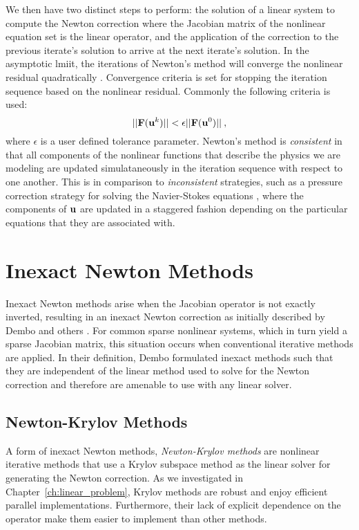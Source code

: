 We then have two distinct steps to perform: the solution of a linear
system to compute the Newton correction where the Jacobian matrix of
the nonlinear equation set is the linear operator, and the application
of the correction to the previous iterate's solution to arrive at the
next iterate's solution. In the asymptotic lmiit, the iterations of
Newton's method will converge the nonlinear residual quadratically
\citep{kelley_iterative_1995}. Convergence criteria is set for
stopping the iteration sequence based on the nonlinear
residual. Commonly the following criteria is used:
\begin{equation}
  ||\mathbf{F}(\mathbf{u}^{k})|| < \epsilon ||\mathbf{F}(\mathbf{u}^{0})||\:,
  \label{eq:newton_stopping_criteria}
\end{equation}
where $\epsilon$ is a user defined tolerance parameter. Newton's
method is \textit{consistent} in that all components of the nonlinear
functions that describe the physics we are modeling are updated
simulataneously in the iteration sequence with respect to one
another. This is in comparison to \textit{inconsistent} strategies,
such as a pressure correction strategy for solving the Navier-Stokes
equations \citep{pletcher_computational_1997}, where the components of
$\mathbf{u}$ are updated in a staggered fashion depending on the
particular equations that they are associated with.

\section{Inexact Newton Methods}
\label{sec:newton_methods}
Inexact Newton methods arise when the Jacobian operator is not exactly
inverted, resulting in an inexact Newton correction as initially
described by Dembo and others \citep{dembo_inexact_1982}. For common
sparse nonlinear systems, which in turn yield a sparse Jacobian
matrix, this situation occurs when conventional iterative methods are
applied. In their definition, Dembo formulated inexact methods such
that they are independent of the linear method used to solve for the
Newton correction and therefore are amenable to use with any linear
solver.

\subsection{Newton-Krylov Methods}
\label{subsec:newton_krylov_methods}
A form of inexact Newton methods, \textit{Newton-Krylov methods} are
nonlinear iterative methods that use a Krylov subspace method as the
linear solver for generating the Newton correction. As we investigated
in Chapter~\ref{ch:linear_problem}, Krylov methods are robust and
enjoy efficient parallel implementations. Furthermore, their lack of
explicit dependence on the operator make them easier to implement than
other methods.

